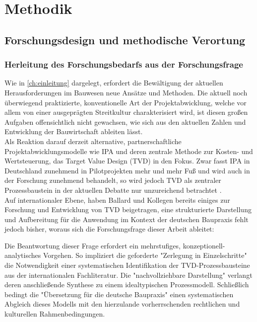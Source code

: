 \chapter{Methodik}
\label{ch:methodik}

\section{Forschungsdesign und methodische Verortung}
\label{sec: 3.1}
\subsection{Herleitung des Forschungsbedarfs aus der Forschungsfrage}
\label{sec: 3.1.1}

Wie in \cref{ch:einleitung} dargelegt, erfordert die Bewältigung der aktuellen Herausforderungen im Bauwesen neue Ansätze und Methoden. Die aktuell noch überwiegend praktizierte, konventionelle  Art der Projektabwicklung, welche vor allem von einer ausgeprägten Streitkultur charakterisiert wird, ist diesen großen Aufgaben offensichtlich nicht gewachsen, wie sich aus den aktuellen Zahlen und Entwicklung der Bauwirtschaft ableiten lässt.\\
Als Reaktion darauf derzeit alternative, partnerschaftliche Projektabwicklungsmodelle wie \ac{IPA} und deren zentrale Methode zur Kosten- und Wertsteuerung, das Target Value Design (\ac{TVD}) in den Fokus. Zwar fasst IPA in Deutschland zunehmend in Pilotprojekten mehr und mehr Fuß und wird auch in der Forschung zunehmend behandelt, so wird jedoch TVD als zentraler Prozessbaustein in der aktuellen Debatte nur unzureichend betrachtet \autocite{haghsheno_ipa-report_2025}.\\
Auf internationaler Ebene, haben Ballard und Kollegen bereits einiges zur Forschung und Entwicklung von \ac{TVD} beigetragen, eine strukturierte Darstellung und Aufbereitung für die Anwendung im Kontext der deutschen Baupraxis fehlt jedoch bisher, woraus sich die Forschungsfrage dieser Arbeit ableitet:


Die Beantwortung dieser Frage erfordert ein mehrstufiges, konzeptionell-analytisches Vorgehen. So impliziert die geforderte "Zerlegung in Einzelschritte" die Notwendigkeit einer systematischen Identifikation der TVD-Prozessbausteine aus der internationalen Fachliteratur. Die "nachvollziehbare Darstellung" verlangt deren anschließende Synthese zu einem idealtypischen Prozessmodell. Schließlich bedingt die "Übersetzung für die deutsche Baupraxis" einen systematischen Abgleich dieses Modells mit den hierzulande vorherrschenden rechtlichen und kulturellen Rahmenbedingungen.


